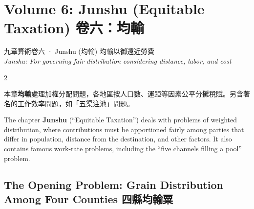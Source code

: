 \documentclass[10pt,a4paper]{article}
\begin{document}
\newpage

\section{Volume 6: Junshu (Equitable Taxation) 卷六：均輸}

\begin{volumeheader}{{九章算術卷六} · Junshu (均輸)}
均輸以御遠近勞費\\[0.2em]
\small\textit{Junshu: For governing fair distribution considering distance, labor, and cost}
\end{volumeheader}

\vspace{0.3cm}

\begin{paracol}{2}
\begin{leftcolumn*}
本章\textbf{均輸}處理加權分配問題，各地區按人口數、運距等因素公平分攤稅賦。另含著名的工作效率問題，如「五渠注池」問題。
\end{leftcolumn*}
\begin{rightcolumn*}
The chapter \textbf{Junshu} (``Equitable Taxation'') deals with problems of weighted distribution, where contributions must be apportioned fairly among parties that differ in population, distance from the destination, and other factors. It also contains famous work-rate problems, including the ``five channels filling a pool'' problem.
\end{rightcolumn*}
\end{paracol}

\subsection{The Opening Problem: Grain Distribution Among Four Counties 四縣均輸粟}
\end{document}
